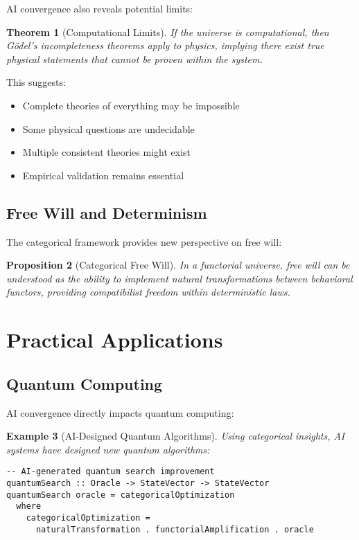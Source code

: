 \documentclass[11pt,a4paper]{article}
\newtheorem{theorem}{Theorem}[section]
\newtheorem{proposition}[theorem]{Proposition}
\newtheorem{example}[theorem]{Example}
\begin{document}
AI convergence also reveals potential limits:

\begin{theorem}[Computational Limits]
If the universe is computational, then Gödel's incompleteness theorems apply to physics, implying there exist true physical statements that cannot be proven within the system.
\end{theorem}

This suggests:
\begin{itemize}
    \item Complete theories of everything may be impossible
    \item Some physical questions are undecidable
    \item Multiple consistent theories might exist
    \item Empirical validation remains essential
\end{itemize}

\subsection{Free Will and Determinism}

The categorical framework provides new perspective on free will:

\begin{proposition}[Categorical Free Will]
In a functorial universe, free will can be understood as the ability to implement natural transformations between behavioral functors, providing compatibilist freedom within deterministic laws.
\end{proposition}

\section{Practical Applications}

\subsection{Quantum Computing}

AI convergence directly impacts quantum computing:

\begin{example}[AI-Designed Quantum Algorithms]
Using categorical insights, AI systems have designed new quantum algorithms:
\begin{lstlisting}
-- AI-generated quantum search improvement
quantumSearch :: Oracle -> StateVector -> StateVector
quantumSearch oracle = categoricalOptimization
  where
    categoricalOptimization = 
      naturalTransformation . functorialAmplification . oracle
\end{lstlisting}
\end{example}
\end{document}
